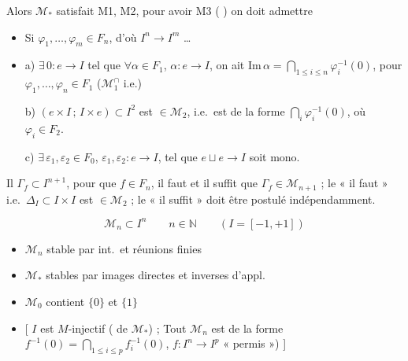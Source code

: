 \documentclass[11pt,a4paper]{article}
\begin{document}
Alors $\mathcal{M}_{*}$ satisfait M1, M2, pour avoir M3 
(\ill{} \ill{}) on doit admettre
\begin{itemize}
  \item[(F3)] Si $\varphi_1, \ldots, \varphi_m \in F_n$, d'où $I^n \to I^m$
  \ldots{}
  \item[(F4)] a) $\exists\, 0 : e \to I$  tel que $\forall
  \alpha \in F_1$, $\alpha : e \to I$, on ait $\mathrm{Im}\, \alpha =
  \bigcap_{1 \leqslant i \leqslant n} \varphi_i^{-1}(0)$, pour $\varphi_1,
  \ldots, \varphi_n \in F_1$ \quad ($\mathcal{M}_1^{\cap}$ i.e.)

  b) \struck{\ill{}} $(e \times I \,;\, I \times e) \subset I^2$ est $\in
  \mathcal{M}_2$, i.e.\ est de la forme $\bigcap_i \varphi_i^{-1}(0)$, où
  $\varphi_i \in F_2$.

  c) $\exists\, \varepsilon_1, \varepsilon_2 \in F_0$, $\varepsilon_1,
  \varepsilon_2 : e \to I$, tel que $e \sqcup e \to I$ soit mono.
\end{itemize}

Il  $\Gamma_f \subset
I^{n+1}$,  \ill{} pour que $f \in F_n$, il faut et il suffit
que $\Gamma_f \in \mathcal{M}_{n+1}$ ;  le « il faut » \ill{} i.e.\ $\Delta_I \subset I \times I$ est $\in
\mathcal{M}_2$ ; le « il suffit » doit être postulé indépendamment.

\[
  \mathcal{M}_n \subset I^n \qquad n \in \mathbb{N} \qquad (I = [-1, +1])
\]

\begin{itemize}
  \item[] $\mathcal{M}_n$ stable par int.\ et réunions finies
  \item[] $\mathcal{M}_{*}$ stables par images directes et inverses
  d'appl.\ 
  \item[] $\mathcal{M}_0$ contient 
  $\lbrace 0 \rbrace$ et $\lbrace 1 \rbrace$
  \item[] \struck{\ill{}} [ $I$ est $M$-injectif (\ill{} \ill{} \ill{}
  \ill{} de $\mathcal{M}_{*}$) ; Tout \struck{\ill{}} $\mathcal{M}_n$ est
  de la forme $f^{-1}(0) = \bigcap_{1 \leqslant i \leqslant p}
  f_i^{-1}(0)$, $f : I^n \to I^p$ « permis ») ]
\end{itemize}
\end{document}
